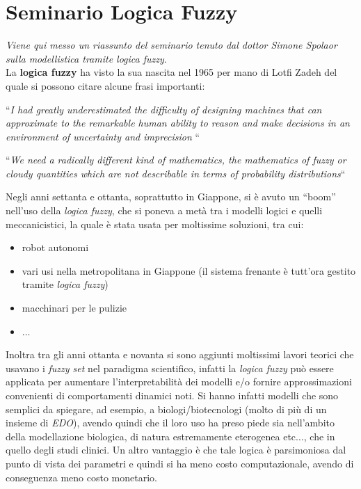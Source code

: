 \documentclass[a4paper,12pt, oneside]{book}
\begin{document}
\section{Seminario Logica Fuzzy}
\textit{Viene qui messo un riassunto del seminario tenuto dal dottor Simone
  Spolaor sulla modellistica tramite logica fuzzy}.\\
La \textbf{logica fuzzy} ha visto la sua nascita nel 1965 per mano di Lotfi
Zadeh del quale si possono citare alcune frasi importanti:
\begin{center}
  ``\textit{I had greatly underestimated the difficulty of designing machines
    that can approximate to the remarkable human ability to reason and
    make decisions in an environment of uncertainty and imprecision} ``
\end{center}
\begin{center}
  ``\textit{We need a radically different kind of mathematics, the mathematics
    of fuzzy or cloudy quantities which are not describable in terms of
    probability distributions}``
\end{center}
Negli anni settanta e ottanta, soprattutto in Giappone, si è avuto un ``boom''
nell'uso della 
\textit{logica fuzzy}, che si poneva a metà tra i modelli logici e quelli
meccanicistici, la quale è stata usata per moltissime soluzioni, tra cui:
\begin{itemize}
  \item robot autonomi
  \item vari usi nella metropolitana in Giappone (il sistema frenante è tutt'ora
  gestito tramite \textit{logica fuzzy})
  \item macchinari per le pulizie
  \item $\ldots$
\end{itemize}
Inoltra tra gli anni ottanta e novanta si sono aggiunti moltissimi lavori
teorici che usavano i \textit{fuzzy set} nel paradigma scientifico, infatti la
\textit{logica fuzzy} può essere applicata per aumentare l'interpretabilità dei
modelli e/o fornire approssimazioni convenienti di comportamenti dinamici
noti. Si hanno infatti modelli che sono semplici da spiegare, ad esempio, a
biologi/biotecnologi (molto di più di un insieme di \textit{EDO}), avendo quindi
che il loro uso ha preso piede sia nell'ambito della modellazione biologica, di
natura estremamente eterogenea etc$\ldots$, che in quello
degli studi clinici. Un altro vantaggio è che tale logica è parsimoniosa dal
punto di vista dei parametri e quindi si ha meno costo computazionale, avendo di
conseguenza meno costo monetario.\\ 
\end{document}
